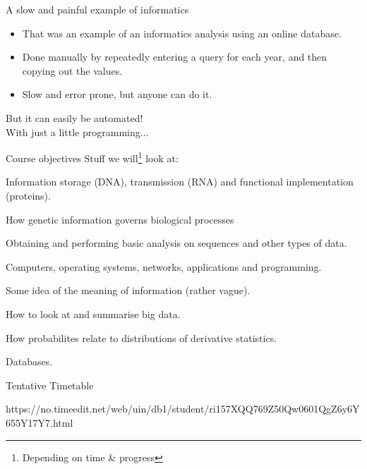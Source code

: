 \documentclass[pdf]{beamer}
\begin{document}
\begin{frame}{A slow and painful example of informatics}
  \begin{itemize}
    \item That was an example of an informatics analysis using an online database.
      \pause
    \item Done manually by repeatedly entering a query for each year, and then copying out the values.
      \pause
    \item Slow and error prone, but anyone can do it.
  \end{itemize}
  \pause
  But it can easily be automated!\\
  \tiny With just a little programming...
\end{frame}

\begin{frame}{Course objectives}
  Stuff we will\footnote{Depending on time \& progress} look at:
  \footnotesize
  \begin{description}
    \item[Molecular biology] Information storage (DNA), transmission (RNA) and functional implementation (proteins).
    \item[Molecular biology (2)] How genetic information governs biological processes
    \item[Practical Bioinformatics] Obtaining and performing basic analysis on sequences and other types of data.
    \item[Computers...] Computers, operating systems, networks, applications and programming. 
    \item[Theoretical informatics] Some idea of the meaning of information (rather vague).
    \item[Data visualisation] How to look at and summarise big data.
    \item[Statistics] How probabilites relate to distributions of derivative statistics.
    \item[Data organisation] Databases.
  \end{description}
\end{frame}

\begin{frame}{Tentative Timetable}
\vspace*{-0.4cm}                        
\begin{figure}[ht]
  \tiny
  
  \end{figure}
  \vspace*{-0.4cm}
  \tiny
  https://no.timeedit.net/web/uin/db1/student/ri157XQQ769Z50Qw0601QgZ6y6Y655Y17Y7.html
  
\end{frame}
\end{document}
